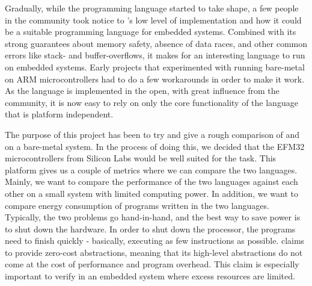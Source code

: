 Gradually, while the {\rust} programming language started to take shape, a few people in the community took notice to {\rust}'s low level of implementation and how it could be a suitable programming language for embedded systems.
Combined with its strong guarantees about memory safety, absence of data races, and other common errors like stack- and buffer-overflows, it makes for an interesting language to run on embedded systems.
Early projects that experimented with running {\rust} bare-metal on ARM microcontrollers had to do a few workarounds in order to make it work.
As the language is implemented in the open, with great influence from the community, it is now easy to rely on only the core functionality of the language that is platform independent.

The purpose of this project has been to try and give a rough comparison of {\rust} and {\C} on a bare-metal system.
In the process of doing this, we decided that the EFM32 microcontrollers from Silicon Labs would be well suited for the task.
This platform gives us a couple of metrics where we can compare the two languages.
Mainly, we want to compare the performance of the two languages against each other on a small system with limited computing power.
In addition, we want to compare energy consumption of programs written in the two languages.
Typically, the two problems go hand-in-hand, and the best way to save power is to shut down the hardware.
In order to shut down the processor, the programs need to finish quickly - basically, executing as few instructions as possible.
{\rust} claims to provide zero-cost abstractions, meaning that its high-level abstractions do not come at the cost of performance and program overhead.
This claim is especially important to verify in an embedded system where excess resources are limited.








